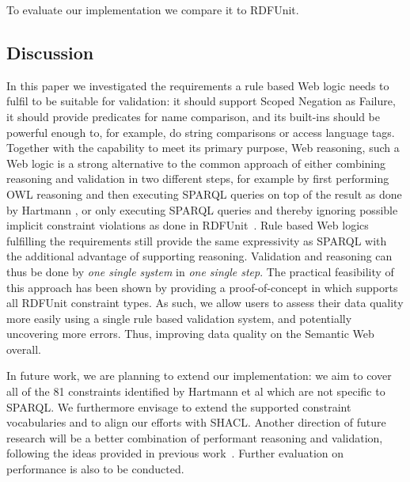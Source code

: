 To evaluate our implementation we compare it to RDFUnit.

\subsection{Discussion}\label{conc}
In this paper we investigated the requirements a rule based Web logic needs to fulfil to be suitable for \rdf validation:
it should support Scoped Negation as Failure, it should provide predicates for name comparison, and its built-ins should be powerful enough to, for example, 
do string comparisons or access language tags.  Together with the capability to meet its primary purpose, Web reasoning, such a Web logic is
a strong alternative to the common approach of either combining reasoning and validation in two different steps, for example by first performing OWL reasoning and 
then executing SPARQL queries on top of the result as done by Hartmann \cite{hartmann2016}, or only executing SPARQL queries and thereby ignoring possible 
implicit constraint violations
as done in RDFUnit~\cite{kontokostas2014test}. Rule based Web logics fulfilling the requirements still provide the same expressivity as SPARQL with the additional advantage
of supporting reasoning. Validation and reasoning can thus be done by \emph{one single system} in \emph{one single step}. 
%
The practical feasibility of this approach has been shown by providing a proof-of-concept in \nthreelogic which supports all RDFUnit constraint types. 
As such, we allow users to assess 
their data quality more easily using a single rule based validation system, and potentially uncovering more errors. Thus, improving data quality on the Semantic Web overall.

In future work, we are planning to extend our implementation:
we aim to cover all of the 81 constraints identified by Hartmann et al \cite{bosch2015} which are not specific to SPARQL. We furthermore 
envisage to extend the supported \rdf constraint vocabularies and to align our efforts with SHACL.  
Another direction of future research will be a better combination of performant reasoning and validation, following the ideas provided in previous work~\cite{arndt_owled_2015}.
Further evaluation on performance is also to be conducted.
